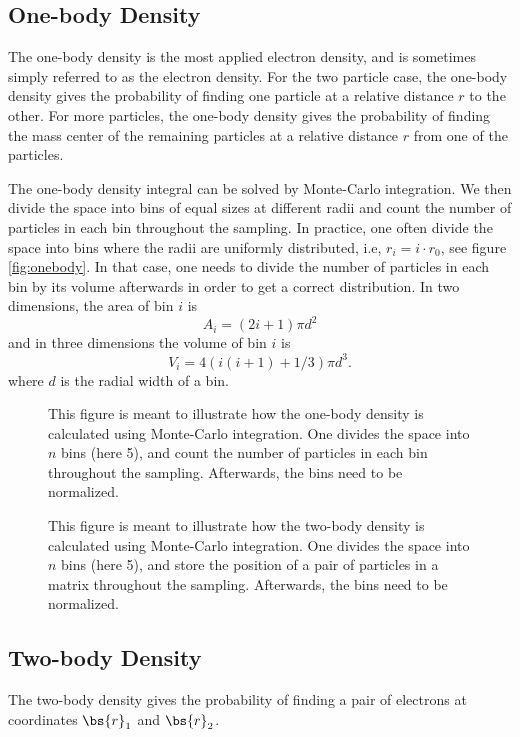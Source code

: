 \subsection{One-body Density}
The one-body density is the most applied electron density, and is sometimes simply referred to as the electron density. For the two particle case, the one-body density gives the probability of finding one particle at a relative distance $r$ to the other. For more particles, the one-body density gives the probability of finding the mass center of the remaining particles at a relative distance $r$ from one of the particles.

The one-body density integral can be solved by Monte-Carlo integration. We then divide the space into bins of equal sizes at different radii and count the number of particles in each bin throughout the sampling. In practice, one often divide the space into bins where the radii are uniformly distributed, i.e, $r_i=i\cdot r_0$, see figure \eqref{fig:onebody}. In that case, one needs to divide the number of particles in each bin by its volume afterwards in order to get a correct distribution. In two dimensions, the area of bin $i$ is
\begin{equation}
A_i=(2i+1)\pi d^2
\end{equation}
and in three dimensions the volume of bin $i$ is
\begin{equation}
V_i=4(i(i+1)+1/3)\pi d^3.
\end{equation}
where $d$ is the radial width of a bin. 

\begin{figure}
	\centering
	\label{fig:onebody}
	
	\caption{This figure is meant to illustrate how the one-body density is calculated using Monte-Carlo integration. One divides the space into $n$ bins (here 5), and count the number of particles in each bin throughout the sampling. Afterwards, the bins need to be normalized.}
\end{figure}

\begin{figure}
	\centering
	\label{fig:twobody}
	
	\caption{This figure is meant to illustrate how the two-body density is calculated using Monte-Carlo integration. One divides the space into $n$ bins (here 5), and store the position of a pair of particles in a matrix throughout the sampling. Afterwards, the bins need to be normalized.}
\end{figure}

\subsection{Two-body Density}
The two-body density gives the probability of finding a pair of electrons at coordinates $\bs{r}_1$ and $\bs{r}_2$. 

